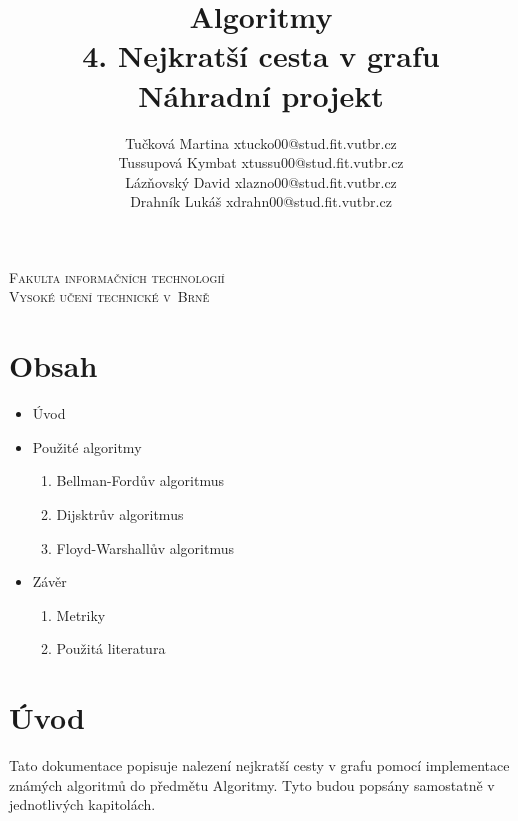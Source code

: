 \documentclass[a4paper,11pt]{article}
\begin{document}
\begin{center}
\textsc{\Huge Fakulta informačních technologií\\
Vysoké učení technické v~Brně\\}

\LARGE \title{Algoritmy\\
\textbf{4. Nejkratší cesta v grafu\\}
Náhradní projekt\\}


\hfill \author{Tučková Martina xtucko00@stud.fit.vutbr.cz\\
 Tussupová Kymbat xtussu00@stud.fit.vutbr.cz\\
 Lázňovský David xlazno00@stud.fit.vutbr.cz\\
 Drahník Lukáš xdrahn00@stud.fit.vutbr.cz}
\end{center}


{\let\newpage\relax\maketitle}

\newpage

\section*{Obsah}
\begin{itemize}
  \item Úvod
  \item Použité algoritmy
  \begin{enumerate}
  \item Bellman-Fordův algoritmus
  \item Dijsktrův algoritmus
  \item Floyd-Warshallův algoritmus
  \end{enumerate}
  \item Závěr
  \begin{enumerate}
  \item Metriky
  \item Použitá literatura
  \end{enumerate}
\end{itemize}

\newpage

\section*{Úvod}
Tato dokumentace popisuje nalezení nejkratší cesty v grafu pomocí implementace známých algoritmů do předmětu Algoritmy.  Tyto budou popsány samostatně v jednotlivých kapitolách. 
\end{document}
